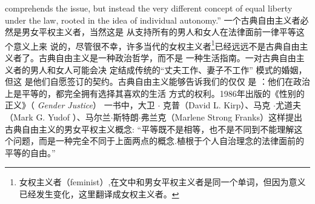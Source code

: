 \begin{paracol}{2}
comprehends the issue, but instead the very different concept of
equal liberty under the law, rooted in the idea of individual autonomy.''
\switchcolumn
一个古典自由主义者必然是男女平权主义者，当然这是
从支持所有的男人和女人在法律面前一律平等这个意义上来
说的，尽管很不幸，许多当代的女权主义者\footnote{女权主义者（feminist）,在文中和男女平权主义者是同一个单词，但因为意义已经发生变化，这里翻译成女权主义者。}已经远远不是古典自由主义者了。古典自由主义是一种政治哲学，而不是
一种生活指南。一对古典自由主义者的男人和女人可能会决
定结成传统的“丈夫工作、妻子不工作” 模式的婚姻，但这
是他们自愿签订的契约。古典自由主义能够告诉我们的仅仅
是 ：他们在政治上是平等的，都完全拥有选择其喜欢的生活
方式的权利。1986年出版的《性别的正义》（ \textit{Gender Justice}） 一书中，大卫 $\cdot$ 克普（David L. Kirp）、马克 $\cdot$尤道夫（Mark G. Yudof ）、马尔兰$\cdot$斯特朗$\cdot$弗兰克（Marlene Strong Franks）这样提出古典自由主义的男女平权主义概念:
“平等既不是相等，也不是不同到不能理解这个问题，而是一种完全不同于上面两点的概念.植根于个人自治理念的法律面前的平等的自由。”


\end{paracol}
